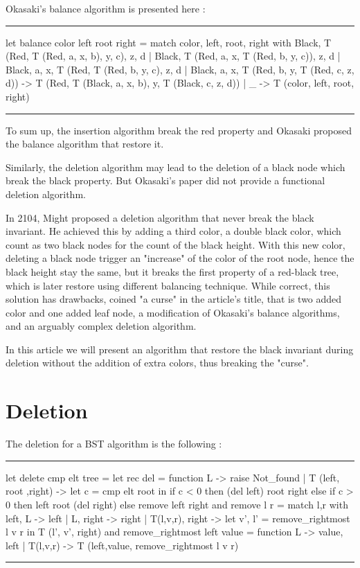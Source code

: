 \documentclass[10pt,a4paper]{article}
\newenvironment{codeblock}%
{\center \minipage{\textwidth} \vspace{6pt} \hrule \vspace{6pt} \minted{ocaml}}%
{\endminted \hrule \vspace{6pt} \endminipage \endcenter}
\begin{document}
Okasaki's balance algorithm is presented here :

\begin{codeblock}
   let balance color left root right =
   match color, left, root, right with
   Black, T (Red, T (Red, a, x, b), y, c), z, d
   | Black, T (Red, a, x, T (Red, b, y, c)), z, d
   | Black, a, x, T (Red, T (Red, b, y, c), z, d
   | Black, a, x, T (Red, b, y, T (Red, c, z, d)) ->
   T (Red, T (Black, a, x, b), y, T (Black, c, z, d))
   | _ ->
   T (color, left, root, right)
\end{codeblock}

To sum up, the insertion algorithm break the red property and Okasaki proposed the balance algorithm that restore it.

Similarly, the deletion algorithm may lead to the deletion of a black node which break the black property. But Okasaki's paper did not provide a functional deletion algorithm.

In 2104, Might proposed a deletion algorithm that never break the black invariant. He achieved this by adding a third color, a double black color, which count as two black nodes for the count of the black height.
With this new color, deleting a black node trigger an "increase" of the color of the root node, hence the black height stay the same, but it breaks the first property of a red-black tree, which is later restore using different balancing technique.
While correct, this solution has drawbacks, coined "a curse" in the article's title, that is two added color and one added leaf node, a modification of Okasaki's balance algorithms, and an arguably complex deletion algorithm.

In this article we will present an algorithm that restore the black invariant during deletion without the addition of extra colors, thus breaking the "curse".

\section{Deletion}

The deletion for a BST algorithm is the following :
\begin{codeblock}
   let delete cmp elt tree =
   let rec del = function
   L -> raise Not_found
   | T (left, root ,right) ->
   let c = cmp elt root in
   if c < 0 then (del left) root right
   else if c > 0 then left root (del right)
   else remove left right
   and remove l r = match l,r with
   left, L  -> left
   | L, right -> right
   | T(l,v,r), right ->
   let v', l' = remove_rightmost l v r in
   T (l', v', right)
   and remove_rightmost left value = function
   L -> value, left
   | T(l,v,r) -> T (left,value, remove_rightmost l v r)
\end{codeblock}
\end{document}
